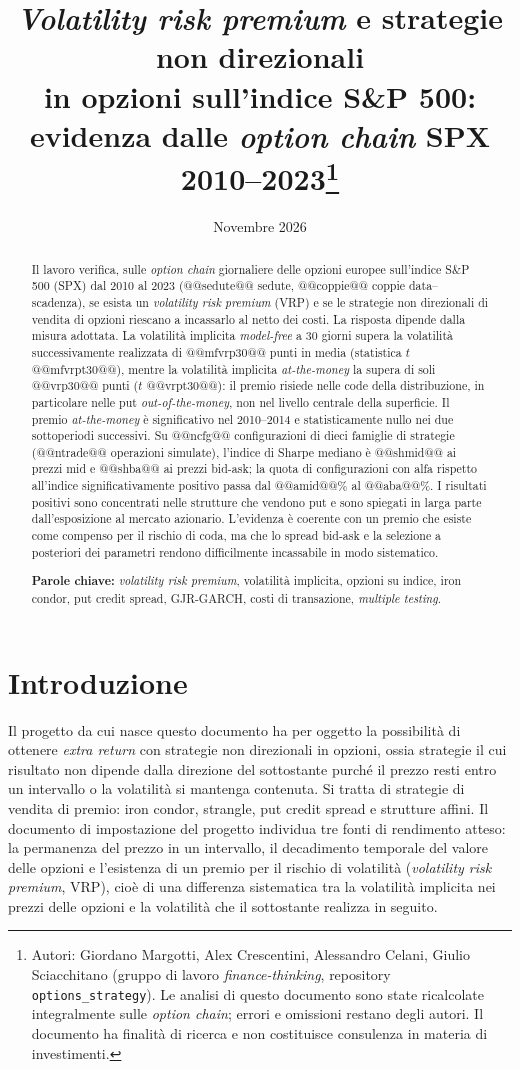 \documentclass[11pt,a4paper]{article}
\title{\emph{Volatility risk premium} e strategie non direzionali\\ in opzioni sull'indice S\&P 500:\\ evidenza dalle \emph{option chain} SPX 2010--2023\thanks{Autori: Giordano Margotti, Alex Crescentini, Alessandro Celani, Giulio Sciacchitano (gruppo di lavoro \emph{finance-thinking}, repository \texttt{options\_strategy}). Le analisi di questo documento sono state ricalcolate integralmente sulle \emph{option chain}; errori e omissioni restano degli autori. Il documento ha finalità di ricerca e non costituisce consulenza in materia di investimenti.}}
\author{}
\date{Novembre 2026}
\begin{document}
{\let\newpage\relax\maketitle}
\vspace{-3em}

\begin{abstract}
\noindent Il lavoro verifica, sulle \emph{option chain} giornaliere delle opzioni europee sull'indice S\&P 500 (SPX) dal 2010 al 2023 (@@sedute@@ sedute, @@coppie@@ coppie data--scadenza), se esista un \emph{volatility risk premium} (VRP) e se le strategie non direzionali di vendita di opzioni riescano a incassarlo al netto dei costi. La risposta dipende dalla misura adottata. La volatilità implicita \emph{model-free} a 30 giorni supera la volatilità successivamente realizzata di @@mfvrp30@@ punti in media (statistica $t$ @@mfvrpt30@@), mentre la volatilità implicita \emph{at-the-money} la supera di soli @@vrp30@@ punti ($t$ @@vrpt30@@): il premio risiede nelle code della distribuzione, in particolare nelle put \emph{out-of-the-money}, non nel livello centrale della superficie. Il premio \emph{at-the-money} è significativo nel 2010--2014 e statisticamente nullo nei due sottoperiodi successivi. Su @@ncfg@@ configurazioni di dieci famiglie di strategie (@@ntrade@@ operazioni simulate), l'indice di Sharpe mediano è @@shmid@@ ai prezzi mid e @@shba@@ ai prezzi bid-ask; la quota di configurazioni con alfa rispetto all'indice significativamente positivo passa dal @@amid@@\% al @@aba@@\%. I risultati positivi sono concentrati nelle strutture che vendono put e sono spiegati in larga parte dall'esposizione al mercato azionario. L'evidenza è coerente con un premio che esiste come compenso per il rischio di coda, ma che lo spread bid-ask e la selezione a posteriori dei parametri rendono difficilmente incassabile in modo sistematico.

\medskip\noindent\textbf{Parole chiave:} \emph{volatility risk premium}, volatilità implicita, opzioni su indice, iron condor, put credit spread, GJR-GARCH, costi di transazione, \emph{multiple testing}.
\end{abstract}

\section{Introduzione}

Il progetto da cui nasce questo documento ha per oggetto la possibilità di ottenere \emph{extra return} con strategie non direzionali in opzioni, ossia strategie il cui risultato non dipende dalla direzione del sottostante purché il prezzo resti entro un intervallo o la volatilità si mantenga contenuta. Si tratta di strategie di vendita di premio: iron condor, strangle, put credit spread e strutture affini. Il documento di impostazione del progetto individua tre fonti di rendimento atteso: la permanenza del prezzo in un intervallo, il decadimento temporale del valore delle opzioni e l'esistenza di un premio per il rischio di volatilità (\emph{volatility risk premium}, VRP), cioè di una differenza sistematica tra la volatilità implicita nei prezzi delle opzioni e la volatilità che il sottostante realizza in seguito.
\end{document}
